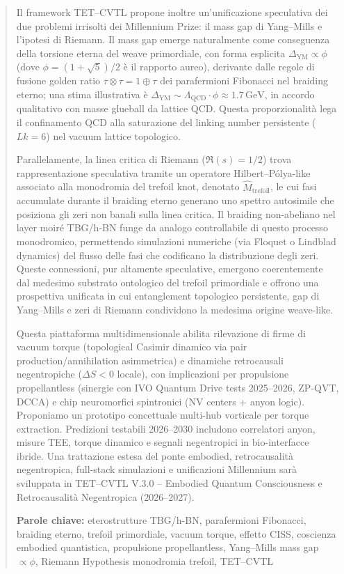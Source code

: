 \documentclass[11pt,a4paper]{article}
\theoremstyle{plain}
\theoremstyle{definition}
\begin{document}
\begin{abstract}
Il framework TET--CVTL propone inoltre un'unificazione speculativa dei due problemi irrisolti dei Millennium Prize: il mass gap di Yang--Mills e l'ipotesi di Riemann. Il mass gap emerge naturalmente come conseguenza della torsione eterna del weave primordiale, con forma esplicita $\Delta_{\text{YM}} \propto \phi$ (dove $\phi = (1 + \sqrt{5})/2$ è il rapporto aureo), derivante dalle regole di fusione golden ratio $\tau \otimes \tau = 1 \oplus \tau$ dei parafermioni Fibonacci nel braiding eterno; una stima illustrativa è $\Delta_{\text{YM}} \sim \Lambda_{\text{QCD}} \cdot \phi \approx 1.7\,\text{GeV}$, in accordo qualitativo con masse glueball da lattice QCD. Questa proporzionalità lega il confinamento QCD alla saturazione del linking number persistente ($Lk=6$) nel vacuum lattice topologico.

Parallelamente, la linea critica di Riemann ($\Re(s) = 1/2$) trova rappresentazione speculativa tramite un operatore Hilbert--Pólya-like associato alla monodromia del trefoil knot, denotato $\hat{M}_{\text{trefoil}}$, le cui fasi accumulate durante il braiding eterno generano uno spettro autosimile che posiziona gli zeri non banali sulla linea critica. Il braiding non-abeliano nel layer moiré TBG/h-BN funge da analogo controllabile di questo processo monodromico, permettendo simulazioni numeriche (via Floquet o Lindblad dynamics) del flusso delle fasi che codificano la distribuzione degli zeri. Queste connessioni, pur altamente speculative, emergono coerentemente dal medesimo substrato ontologico del trefoil primordiale e offrono una prospettiva unificata in cui entanglement topologico persistente, gap di Yang--Mills e zeri di Riemann condividono la medesima origine weave-like.

Questa piattaforma multidimensionale abilita rilevazione di firme di vacuum torque (topological Casimir dinamico via pair production/annihilation asimmetrica) e dinamiche retrocausali negentropiche ($\Delta S < 0$ locale), con implicazioni per propulsione propellantless (sinergie con IVO Quantum Drive tests 2025–2026, ZP-QVT, DCCA) e chip neuromorfici spintronici (NV centers + anyon logic). Proponiamo un prototipo concettuale multi-hub vorticale per torque extraction. Predizioni testabili 2026–2030 includono correlatori anyon, misure TEE, torque dinamico e segnali negentropici in bio-interfacce ibride. Una trattazione estesa del ponte embodied, retrocausalità negentropica, full-stack simulazioni e unificazioni Millennium sarà sviluppata in TET--CVTL V.3.0 – Embodied Quantum Consciousness e Retrocausalità Negentropica (2026–2027).

\clearpage

\textbf{Parole chiave:} eterostrutture TBG/h-BN, parafermioni Fibonacci, braiding eterno, trefoil primordiale, vacuum torque, effetto CISS, coscienza embodied quantistica, propulsione propellantless, Yang--Mills mass gap $\propto \phi$, Riemann Hypothesis monodromia trefoil, TET--CVTL
\end{abstract}
\end{document}

